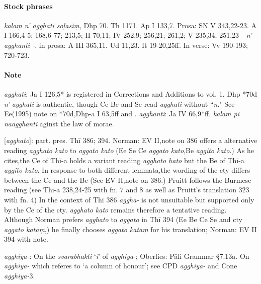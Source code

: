 \documentclass[11pt]{article}
\newcommand*\ṛ{r\symbol{"325}}
\newcommand*\Ṛ{R\symbol{"325}}
\newcommand*\ṝ{r\symbol{"304}\symbol{"325}}
\newcommand*\Ṝ{R\symbol{"304}\symbol{"325}}
\newcommand*\ḷ{l\symbol{"325}}
\newcommand*\ḹ{l\symbol{"304}\symbol{"325}}
\newcommand*\Ḷ{L\symbol{"325}}
\newcommand*\Ḹ{L\symbol{"304}\symbol{"325}}
\begin{document}
\paragraph*{Stock phrases}
\textit{kalaṃ n' agghati soḷasiṃ},
Dhp 70. Th 1171. Ap I 133,7.
Prosa: SN V 343,22-23. A I 166,4-5; 168,6-77; 213,5; II 70,11; IV 252,9; 256,21; 261,2; V 235,34; 251,23
\textit{- n' agghanti -}.
in prosa: A III 365,11.
Ud 11,23.
It 19-20,25ff.
In verse: Vv 190-193; 720-723.

\paragraph*{Note}
\textit{agghati}: Ja I 126,5* is registered in Corrections and Additions to vol. 1.
Dhp *70d \textit{n' agghati} is authentic,
though Ce Be and Se read \textit{agghati} without ``\textit{n}."
See Ee(1995) note on *70d,Dhp-a I 63,5ff and
\citet[163]{rau:1959}.
\textit{agghanti}: Ja IV 66,9*ff. \textit{kalam pi naagghanti} aginst the law of morae.

 [\textit{agghato}]: part. pres. Thī 386; 394.
Norman: EV II,note on 386 offers a alternative reading \textit{agghato kato} to \textit{aggato kato} (Ee Se Ce \textit{aggato kato},Be \textit{aggito kato}.)
As he cites,the Ce of Thī-a holds a variant reading \textit{agghato hato} but the Be of Thī-a \textit{aggito kato}.
In response to both different lemmata,the wording of the cty differs between the Ce and the Be (See EV II,note on 386.)
Pruitt follows the Burmese reading (see Thī-a 238,24-25 with fn. 7 and 8 as well as Pruitt's translation 323 with fn. 4)
In the context of Thī 386 \textit{aggha-} is not unsuitable but supported only by the Ce of the cty.
\textit{agghato kato} remains therefore a tentative reading.
Although Norman prefers \textit{agghato} to \textit{aggato} in Thī 394 (Ee Be Ce Se and cty \textit{aggato kataṃ},)
he finally chooses \textit{aggato kataṃ} for his translation; Norman: EV II 394 with note.

\textit{agghiya-}: On the \textit{svarabhakti} `\textit{i}' of \textit{agghiya}-; Oberlies: Pāli Grammar §7.13a.
On \textit{agghiya-} which referes to `a column of honour'; see CPD \textit{agghiya-} and Cone \textit{agghiya-}3.


%
%
\end{document}
